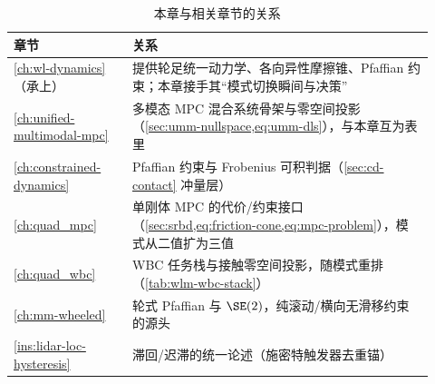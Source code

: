 \begin{table}[H]\centering\small
\caption{本章与相关章节的关系}
\label{tab:wlm-relations}
\begin{tabular}{p{0.26\linewidth}p{0.66\linewidth}}
\toprule
章节 & 关系 \\
\midrule
\cref{ch:wl-dynamics}（承上） & 提供轮足统一动力学、各向异性摩擦锥、Pfaffian 约束；本章接手其“模式切换瞬间与决策” \\
\cref{ch:unified-multimodal-mpc} & 多模态 MPC 混合系统骨架与零空间投影（\cref{sec:umm-nullspace,eq:umm-dls}），与本章互为表里 \\
\cref{ch:constrained-dynamics} & Pfaffian 约束与 Frobenius 可积判据（\cref{sec:cd-contact} 冲量层） \\
\cref{ch:quad_mpc} & 单刚体 MPC 的代价/约束接口（\cref{sec:srbd,eq:friction-cone,eq:mpc-problem}），模式从二值扩为三值 \\
\cref{ch:quad_wbc} & WBC 任务栈与接触零空间投影，随模式重排（\cref{tab:wlm-wbc-stack}） \\
\cref{ch:mm-wheeled} & 轮式 Pfaffian 与 $\SE(2)$，纯滚动/横向无滑移约束的源头 \\
\cref{ins:lidar-loc-hysteresis} & 滞回/迟滞的统一论述（施密特触发器去重锚） \\
\bottomrule
\end{tabular}
\end{table}
